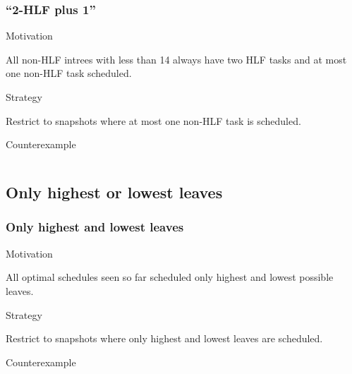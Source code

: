 \documentclass{beamer}
\newenvironment{strategyblock}
{
  \begin{block}{Strategy}
}
{
  \end{block}
}
\newenvironment{motivationblock}
{
  \begin{block}{Motivation}
}
{
  \end{block}
}
\newenvironment{counterexampleblock}
{
  \begin{alertblock}{Counterexample}
}
{
  \end{alertblock}
}
\begin{document}
\begin{frame}
  \frametitle{``2-HLF plus 1''}
  \begin{motivationblock}
    All non-HLF intrees with less than 14 always have two HLF tasks and at most one non-HLF task scheduled.
  \end{motivationblock}
  \begin{strategyblock}
    Restrict to snapshots where at most one non-HLF task is scheduled.
  \end{strategyblock}
  \begin{counterexampleblock}
    \begin{columns}
      \begin{column}{.5\textwidth}
        
      \end{column}
      \begin{column}{.5\textwidth}
              
      \end{column}
    \end{columns}
  \end{counterexampleblock}
\end{frame}

\subsection{Only highest or lowest leaves}

\begin{frame}
  \frametitle{Only highest and lowest leaves}
  \begin{motivationblock}
    All optimal schedules seen so far scheduled only highest and lowest possible leaves.
  \end{motivationblock}
  \begin{strategyblock}
    Restrict to snapshots where only highest and lowest leaves are scheduled.
  \end{strategyblock}
  \begin{counterexampleblock}
    \begin{columns}
      \begin{column}{.5\textwidth}
        \begin{center}
          
        \end{center}      
      \end{column}
      \begin{column}{.5\textwidth}
        \begin{center}
          
        \end{center}      
      \end{column}
    \end{columns}
  \end{counterexampleblock}
\end{frame}
\end{document}
